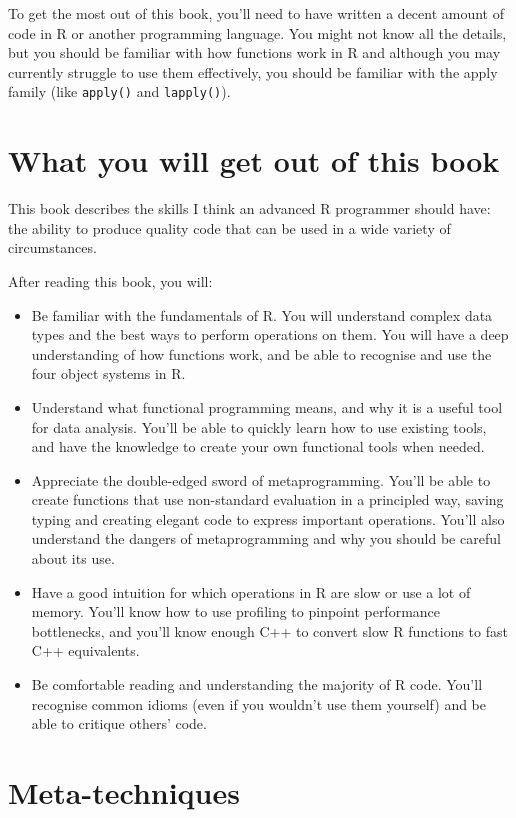 To get the most out of this book, you'll need to have written a decent
amount of code in R or another programming language. You might not know
all the details, but you should be familiar with how functions work in R
and although you may currently struggle to use them effectively, you
should be familiar with the apply family (like \texttt{apply()} and
\texttt{lapply()}).

\section{What you will get out of this book}\label{what-you-will-get}

This book describes the skills I think an advanced R programmer should
have: the ability to produce quality code that can be used in a wide
variety of circumstances.

After reading this book, you will:

\begin{itemize}
\item
  Be familiar with the fundamentals of R. You will understand complex
  data types and the best ways to perform operations on them. You will
  have a deep understanding of how functions work, and be able to
  recognise and use the four object systems in R.
\item
  Understand what functional programming means, and why it is a useful
  tool for data analysis. You'll be able to quickly learn how to use
  existing tools, and have the knowledge to create your own functional
  tools when needed.
\item
  Appreciate the double-edged sword of metaprogramming. You'll be able
  to create functions that use non-standard evaluation in a principled
  way, saving typing and creating elegant code to express important
  operations. You'll also understand the dangers of metaprogramming and
  why you should be careful about its use.
\item
  Have a good intuition for which operations in R are slow or use a lot
  of memory. You'll know how to use profiling to pinpoint performance
  bottlenecks, and you'll know enough C++ to convert slow R functions to
  fast C++ equivalents.
\item
  Be comfortable reading and understanding the majority of R code.
  You'll recognise common idioms (even if you wouldn't use them
  yourself) and be able to critique others' code.
\end{itemize}

\section{Meta-techniques}\label{meta-techniques}

